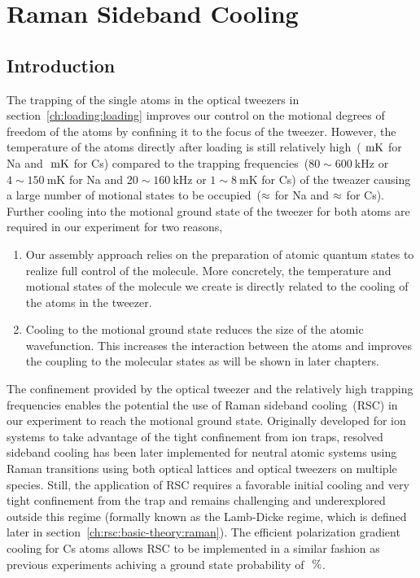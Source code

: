 
\chapter{Raman Sideband Cooling}
\label{ch:rsc}

\section{Introduction}
\label{ch:rsc:introduction}

The trapping of the single atoms in the optical tweezers in section~\ref{ch:loading:loading}
improves our control on the motional degrees of freedom of the atoms
by confining it to the focus of the tweezer.
However, the temperature of the atoms directly after loading
is still relatively high~($\todo{number}~\mathrm{mK}$ for Na and
$\todo{number}~\mathrm{mK}$ for Cs)
compared to the trapping frequencies~($80\sim600~\mathrm{kHz}$ or $4\sim150~\mathrm{mK}$ for Na
and $20\sim160~\mathrm{kHz}$ or $1\sim8~\mathrm{mK}$ for Cs)
of the tweazer causing a large number of motional states
to be occupied~($\approx\todo{number}$ for Na and $\approx\todo{number}$ for Cs).
Further cooling into the motional ground state of the tweezer for both atoms
are required in our experiment for two reasons,
\begin{enumerate}
\item Our assembly approach relies on the preparation of atomic quantum states
  to realize full control of the molecule.
  More concretely, the temperature and motional states of the molecule we create
  is directly related to the cooling of the atoms in the tweezer.
\item Cooling to the motional ground state reduces the size of the atomic wavefunction.
  This increases the interaction between the atoms and
  improves the coupling to the molecular states as will be shown in later chapters.
\end{enumerate}

The confinement provided by the optical tweezer and the relatively high trapping frequencies
enables the potential the use of Raman sideband cooling~(RSC)
in our experiment to reach the motional ground state.
Originally developed for ion systems to take advantage of the tight confinement from ion traps,
resolved sideband cooling has been later implemented for neutral atomic systems
using Raman transitions using both optical lattices and optical tweezers
on multiple species. Still, the application of RSC requires a favorable initial cooling
and very tight confinement from the trap and remains challenging and underexplored
outside this regime (formally known as the Lamb-Dicke regime,
which is defined later in section~\ref{ch:rsc:basic-theory:raman}).
The efficient polarization gradient cooling for Cs atoms allows RSC
to be implemented in a similar fashion as previous experiments
achiving a ground state probability of $\todo{number}~\mathrm{\%}$.

